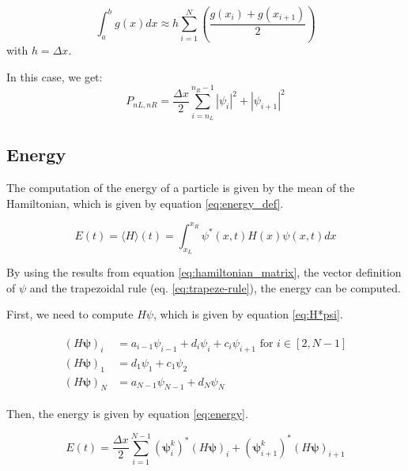 \documentclass[a4paper,12pt,twoside]{article}
\newcommand{\mbf}[1]{\mathbf{#1}} %
\newcommand{\bracket}[1]{\left(#1\right)}
\begin{document}
    \begin{equation}
      \int_a^b g(x)dx \approx h\sum_{i=1}^N\bracket{\frac{g(x_i) + g(x_{i+1})}{2}}
      \label{eq:trapeze-rule}
    \end{equation}
    with $h = \Delta x$.

    In this case, we get:
    \begin{equation}
     P_{nL,nR}=\frac{\Delta x}{2}\sum_{i=n_L}^{n_R-1} |\psi_i|^2+|\psi_{i+1}|^2
    \end{equation}


  \subsection{Energy}
    The computation of the energy of a particle is given by the mean of the Hamiltonian, which is given by equation \eqref{eq:energy_def}.

    \begin{equation}
      E(t) = \langle H \rangle(t) = \int_{x_L}^{x_R}\psi^*(x,t)H(x)\psi(x,t)dx
      \label{eq:energy_def}
    \end{equation}

    By using the results from equation \eqref{eq:hamiltonian_matrix}, the vector definition of $\psi$ and the trapezoidal rule (eq. \eqref{eq:trapeze-rule}), the energy can be computed.

    First, we need to compute $H\psi$, which is given by equation \eqref{eq:H*psi}.

    \begin{align}
      \begin{split}
        (H\mbf{\psi})_i &= a_{i-1}\psi_{i-1} + d_i\psi_i + c_i\psi_{i+1} \text{ for } i\in[2, N-1]\\
        (H\mbf{\psi})_1 &= d_1\psi_1 + c_1\psi_2 \\
        (H\mbf{\psi})_N &= a_{N-1}\psi_{N-1} + d_N\psi_N
      \end{split}
      \label{eq:H*psi}
    \end{align}

    Then, the energy is given by equation \eqref{eq:energy}.

    \begin{equation}
      E(t) = \frac{\Delta x}{2}\sum_{i=1}^{N-1} (\mbf{\psi}_i^k)^*(H\mbf{\psi})_i + (\mbf{\psi}_{i+1}^k)^*(H\mbf{\psi})_{i+1}
      \label{eq:energy}
    \end{equation}
\end{document}
